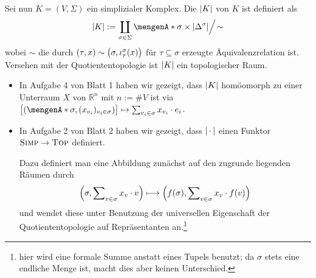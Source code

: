 \noindent Sei nun $K=(V, \Sigma)$ ein simplizialer Komplex. Die  $\abs*{K}$ von $K$ ist definiert als 
\[
	\abs*{K} := \coprod_{\sigma \in \Sigma} \set{\sigma} \times \abs*{\Delta^\sigma} \Big/ \!\sim
\] 
wobei $\sim$ die durch $(\tau, x) \sim \enbrace[\big]{\sigma, \iota_\tau^\sigma(x)}$ für $\tau \subseteq \sigma$ erzeugte Äquivalenzrelation ist. 
Versehen mit der Quotiententopologie ist $\abs*{K}$ ein topologischer Raum. 
\begin{itemize}
	\item In Aufgabe 4 von Blatt 1 haben wir gezeigt, dass $\abs*{K}$ homöomorph zu einer Unterraum $X$ von
	$\mathds{R}^n$ mit $n:= \# V$ ist via $\benbrace[\big]{\enbrace*{\set{\sigma}, (x_{v_i})_{v_i \in \sigma} } } \mapsto \sum_{v_i \in \sigma} x_{v_i} \cdot e_i$.
	\item In Aufgabe 2 von Blatt 2 haben wir gezeigt, dass $\abs*{\,\cdot\,} $ einen Funktor $\SIMP \to \TOP$ definiert.
	
	Dazu definiert man eine Abbildung zunächst auf den zugrunde liegenden Räumen durch
	\[
		\enbrace*{\sigma, \sum\nolimits_{v \in \sigma} x_v \cdot v} \longmapsto \enbrace*{f(\sigma), \sum\nolimits_{v \in \sigma} x_v \cdot f(v)} 
	\]
	und wendet diese unter Benutzung der universellen Eigenschaft der Quotiententopologie auf Repräsentanten an.\footnote{hier wird eine formale Summe anstatt eines Tupels 
	benutzt; da $\sigma$ stets eine endliche Menge ist, macht dies aber keinen Unterschied.}
\end{itemize}


